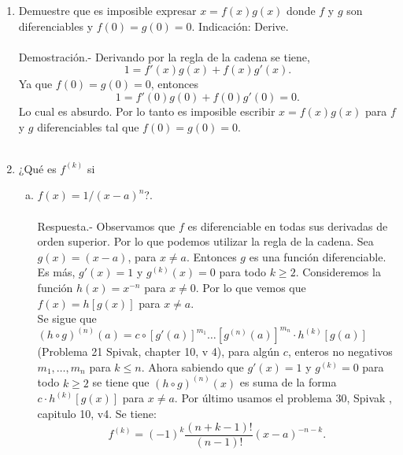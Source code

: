 \begin{enumerate}[\bfseries 1.]
     \item Demuestre que es imposible expresar $x=f(x)g(x)$ donde $f$ y $g$ son diferenciables y $f(0)=g(0)=0.$ Indicación: Derive.\\\\
	 Demostración.-\; Derivando por la regla de la cadena se tiene,
	 $$1=f'(x)g(x)+f(x)g'(x).$$
	 Ya que $f(0)=g(0)=0$, entonces
	 $$1=f'(0)g(0)+f(0)g'(0)=0.$$
	 Lo cual es absurdo. Por lo tanto es imposible escribir $x=f(x)g(x)$ para $f$ y $g$ diferenciables tal que $f(0)=g(0)=0.$\\\\ 

     \item ¿Qué es $f^{(k)}$ si

	 \begin{enumerate}[(a)]

	    \item $f(x)=1/(x-a)^n$?.\\\\
		Respuesta.-\; Observamos que $f$ es diferenciable en todas sus derivadas de orden superior. Por lo que podemos utilizar la regla de la cadena. Sea $g(x)=(x-a)$, para $x\neq a.$ Entonces $g$ es una función diferenciable. Es más, $g'(x)=1$ y $g^{(k)}(x)=0$ para todo $k\geq 2$. Consideremos la función $h(x)=x^{-n}$ para $x\neq 0$. Por lo que vemos que $f(x)=h\left[g(x)\right]$ para $x\neq a.$\\
		Se sigue que $(h\circ g)^{(n)}(a)=c\circ \left[g'(a)\right]^{m_1}\ldots \left[g^{(n)}(a)\right]^{m_n}\cdot h^{(k)}\left[g(a)\right]$ (Problema 21 Spivak, chapter 10, v 4), para algún $c$, enteros no negativos $m_1,\ldots , m_n$ para $k\leq n.$ Ahora sabiendo que $g'(x)=1$ y $g^{(k)}=0$ para todo $k\geq 2$ se tiene que $(h\circ g)^{(n)}(x)$ es suma de la forma $c\cdot h^{(k)}\left[g(x)\right]$ para $x\neq a$. Por último usamos el problema 30, Spivak , capitulo 10, v4. Se tiene:
		$$f^{(k)}=(-1)^k \dfrac{(n+k-1)!}{(n-1)!}(x-a)^{-n-k}.$$\\


\end{enumerate}
\end{enumerate}
